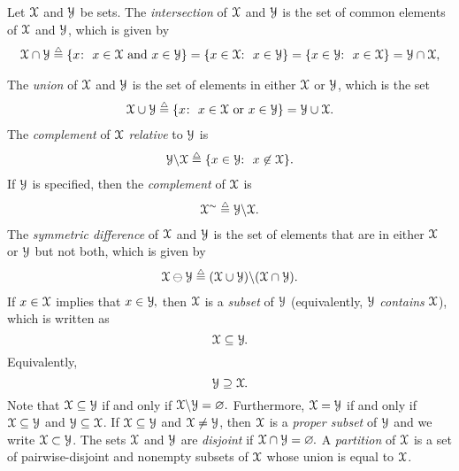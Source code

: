 Let ${\mathcal X}$ and ${\mathcal Y}$ be sets. The {\it intersection}
%
of ${\mathcal X}$ and ${\mathcal Y}$ is the set of common elements of ${\mathcal X}$ and
${\mathcal Y}$, which is given by
\begin{align}
\SX\cap \SY
%
\isdef\{x\mspace{-1mu}\colon\ x\in \SX \mbox{ and } x\in \SY \}
%
=  \{ x\in \SX \mspace{-2mu}\colon\ x\in \SY \}
%
=\{x\in \SY\mspace{-2mu}\colon\ x\in \SX \}
%
= \SY \cap \SX,\end{align}

\label{capsym}%
%
The {\it union} of ${\mathcal X} $ and ${\mathcal Y}$ is the set of
elements in either ${\mathcal X} $ or ${\mathcal Y}$, which is the set
%
%
\begin{align}\SX \cup \SY \isdef\{x\mspace{-1mu}\colon\ x\in \SX \mbox{ or } x\in \SY \}=\SY \cup
\SX.\end{align}
\label{cupsym}%
%
%
The {\it complement}
\label{backslashsym}%
%
%
of  ${\mathcal X}$ {\it relative} to ${\mathcal Y}$ is
%
\begin{align}\SY  \backslash\SX \isdef \{x \in \SY
\mspace{-2mu}\colon\ x \not\in \SX \}.\end{align}
%
\label{simsym}%
%
%
%
If  ${\mathcal Y}$ is specified, then the {\it complement} of ${\mathcal X}$ is
%
\begin{align}\SX^\sim \isdef \SY \backslash  \SX.\end{align}
%
The {\it symmetric difference}
%
of ${\mathcal X}$ and ${\mathcal Y}$ is the set of elements that are in either ${\mathcal X}$ or ${\mathcal Y}$ but not both, which is given by
%
\begin{align}
\SX\ominus \SY
%
\isdef (\SX \cup \SY)\backslash(\SX \cap \SY).
%
\end{align}
\label{symdiffsym}%
%
If $x\in {\mathcal X} $ implies that $x\in {\mathcal Y}\mspace{-1mu},$ then
%
${\mathcal X}$ is a {\it subset}
\label{subseteqsym}%
%
of ${\mathcal Y}$ (equivalently, ${\mathcal Y}$ {\it contains} ${\mathcal X}$), which is written as
%
%
\begin{equation}
{\mathcal X} \subseteq{\mathcal Y}\mspace{-1mu}.\end{equation}
%
Equivalently,
%
\begin{equation}
{\mathcal Y} \supseteq{\mathcal X}\mspace{-1mu}.\end{equation}
%
Note that ${\mathcal X} \subseteq{\mathcal Y}$ if and only if ${\mathcal X}\backslash{\mathcal Y}=\varnothing.$
%
Furthermore, ${\mathcal X} ={\mathcal Y}$ if and only if
${\mathcal X} \subseteq {\mathcal Y} $ and ${\mathcal Y} \subseteq {\mathcal X} $. If ${\mathcal X} \subseteq
{\mathcal Y} $ and ${\mathcal X} \not= {\mathcal Y} $, then ${\mathcal X}$ is a {\it proper subset}
\label{subsetneqsym}%
%
of ${\mathcal Y}$ and we write ${\mathcal X} \subset   {\mathcal Y} $.
%
The sets ${\mathcal X}$ and
${\mathcal Y}$ are {\it disjoint}
%
if ${\mathcal X} \cap {\mathcal Y} =\varnothing\mspace{-1mu}.$
%
A {\it partition}
%
of ${\mathcal X}$ is a set of pairwise-disjoint and nonempty subsets of ${\mathcal X}$
whose union is equal to ${\mathcal X}$.


